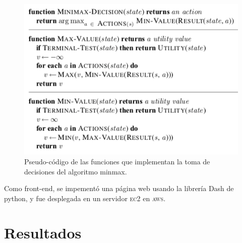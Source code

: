 \documentclass[11pt]{article}
\begin{document}
\begin{figure}
\begin{center}
\includegraphics[scale=.5]{imagenes/busqueda-minmax}
\end{center}
\caption{Pseudo-código de las funciones que implementan la toma de decisiones del algoritmo minmax.}\label{fig:minmax}
\end{figure}

Como front-end, se impementó una página web usando la librería Dash de python, y fue desplegada en un servidor \textsc{ec2} en \textsc{aws}.

\section{Resultados}
\end{document}
